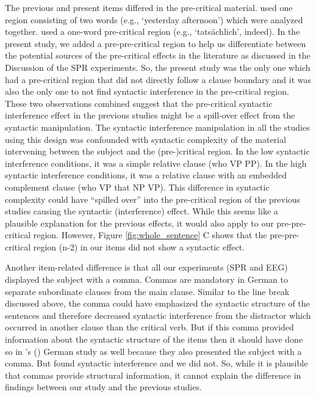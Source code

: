 \documentclass[review,preprint,12pt,authoryear,floatsintext]{elsarticle}
\begin{document}
{The previous and present items differed in the pre-critical material. \citet{vandyke07} used one region consisting of two words (e.g., `yesterday afternoon') which were analyzed together. \cite{mertzen} used a one-word pre-critical region (e.g., `tatsächlich', indeed). In the present study, we added a pre-pre-critical region to help us differentiate between the potential sources of the pre-critical effects in the literature as discussed in the Discussion of the SPR experiments. So, the present study was the only one which had a pre-critical region that did not directly follow a clause boundary and it was also the only one to not find syntactic interference in the pre-critical region. These two observations combined suggest that the pre-critical syntactic interference effect in the previous studies might be a spill-over effect from the syntactic manipulation. The syntactic interference manipulation in all the studies using this design was confounded with syntactic complexity of the material intervening between the subject and the (pre-)critical region. In the low syntactic interference conditions, it was a simple relative clause (who VP PP). In the high syntactic interference conditions, it was a relative clause with an embedded complement clause (who VP that NP VP). This difference in syntactic complexity could have ``spilled over'' into the pre-critical region of the previous studies causing the syntactic (interference) effect. While this seems like a plausible explanation for the previous effects, it would also apply to our pre-pre-critical region. However, Figure \ref{fig:whole_sentence} C shows that the pre-pre-critical region (n-2) in our items did not show a syntactic effect.

{Another item-related difference is that all our experiments (SPR and EEG) displayed the subject with a comma. Commas are mandatory in German to separate subordinate clauses from the main clause. Similar to the line break discussed above, the comma could have emphasized the syntactic structure of the sentences and therefore decreased syntactic interference from the distractor which occurred in another clause than the critical verb. But if this comma provided information about the syntactic structure of the items then it should have done so in \citeauthor{mertzen}'s (\citeyear{mertzen}) German study as well because they also presented the subject with a comma. But \citet{mertzen} found syntactic interference and we did not. So, while it is plausible that commas provide structural information, it cannot explain the difference in findings between our study and the previous studies.}\label{comma}

}
\end{document}
